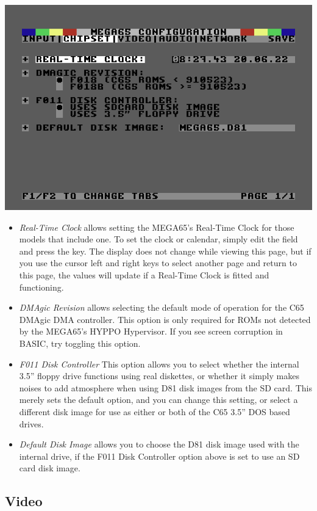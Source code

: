 \includegraphics[width=\linewidth]{images/ss-m65config-2.png}

\begin{itemize}
  \item{\em Real-Time Clock} allows setting the MEGA65's Real-Time
    Clock for those models that include one.  To set the clock or
    calendar, simply edit the field and press the 
    key.  The display does not change while viewing this page, but if
    you use the cursor left and right keys to select another page and
    return to this page, the values will update if a Real-Time Clock
    is fitted and functioning.
  \item{\em DMAgic Revision} allows selecting the default mode of
    operation for the C65 DMAgic DMA controller.  This option is only
    required for ROMs not detected by the MEGA65's HYPPO Hypervisor.
    If you see screen corruption in BASIC,
    try toggling this option.
  \item{\em F011 Disk Controller}
    This option allows you to select whether the internal 3.5'' floppy
    drive functions using real diskettes, or whether it simply makes
    noises to add atmosphere when using D81 disk images from the SD
    card.  This merely sets the default option, and you can change
    this setting, or select a different disk image for use as either
    or both of the C65 3.5'' DOS based drives.
  \item{\em Default Disk Image} allows you to choose the D81 disk image
    used with the internal drive, if the F011 Disk
    Controller option above is set to use an SD card disk image.    
\end{itemize}

\subsection{Video}

